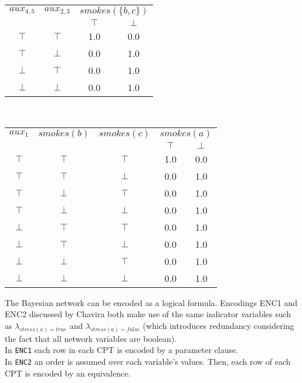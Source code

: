 \begin{multicols*}{2}
\begin{center}
	\begin{tabular}{cc|cc}
		\underline{$aux_{4,5}$} & \underline{$aux_{2,3}$} & \multicolumn{2}{c}{\underline{$smokes(\{b,c\})$}} \\
		& & $\top$ & $\bot$ \\
		$\top$ & $\top$ & 1.0 & 0.0 \\
		$\top$ & $\bot$ & 0.0 & 1.0 \\
		$\bot$ & $\top$ & 0.0 & 1.0 \\
		$\bot$ & $\bot$ & 0.0 & 1.0 \\
	\end{tabular}
	\vspace{0.5cm}\\
	
	\begin{tabular}{ccc|cc}
		\underline{$aux_{1}$} & \underline{$smokes(b)$} & \underline{$smokes(c)$} & \multicolumn{2}{c}{\underline{$smokes(a)$}} \\
		& & & $\top$ & $\bot$ \\
		$\top$ & $\top$ & $\top$ & 1.0 & 0.0 \\
		$\top$ & $\top$ & $\bot$ & 0.0 & 1.0 \\
		$\top$ & $\bot$ & $\top$ & 0.0 & 1.0 \\
		$\top$ & $\bot$ & $\bot$ & 0.0 & 1.0 \\
		$\bot$ & $\top$ & $\top$ & 0.0 & 1.0 \\
		$\bot$ & $\top$ & $\bot$ & 0.0 & 1.0 \\
		$\bot$ & $\bot$ & $\top$ & 0.0 & 1.0 \\
		$\bot$ & $\bot$ & $\bot$ & 0.0 & 1.0 \\
	\end{tabular}
	\vspace{0.5cm}

\end{center}



The Bayesian network can be encoded as a logical formula. Encodings ENC1 and ENC2 discussed by Chavira \cite{chavira} both make use of the same indicator variables such as $\lambda_{stress(a)=true}$ and $\lambda_{stress(a)=false}$ (which introduces redundancy considering the fact that all network variables are boolean). \\

\noindent In \texttt{ENC1} each row in each CPT is encoded by a parameter clause.\\
\noindent In \texttt{ENC2} an order is assumed over each variable's values. Then, each row of each CPT is encoded by an equivalence.\\


\end{multicols*}
